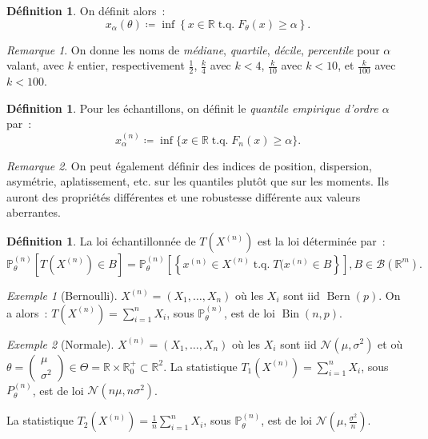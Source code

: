 \documentclass{report}
\DeclareMathOperator{\tq}{\text{ t.q. }}
\DeclareMathOperator{\Bern}{Bern}  %
\DeclareMathOperator{\Bin}{Bin}
\renewcommand{\P}{\mathbb P}
\newcommand{\Nms}{\mathcal N(\mu, \sigma^2)}
\newcommand{\R}{\mathbb R}
\newcommand{\Brl}{\mathcal B}  %
\theoremstyle{definition}
\newtheorem{déf}[thm]{Définition}
\theoremstyle{remark}
\newtheorem*{rmq}{Remarque}
\newtheorem{ex}{Exemple}[chapter]
\begin{document}
		\begin{déf} On définit alors~:
		\[x_\alpha(\theta) \coloneqq \inf\left\{x \in \R \tq F_\theta(x) \geq \alpha\right\}.\]
		\end{déf}

		\begin{rmq} On donne les noms de \textit{médiane}, \textit{quartile}, \textit{décile}, \textit{percentile} pour $\alpha$ valant, avec $k$ entier,
		respectivement $\frac 12$, $\frac k4$ avec $k < 4$, $\frac k{10}$ avec $k < 10$, et $\frac k{100}$ avec $k < 100$.
		\end{rmq}

		\begin{déf} Pour les échantillons, on définit le \textit{quantile empirique d'ordre $\alpha$} par~:
		\[x_\alpha^{(n)} \coloneqq \inf\{x \in \R \tq F_n(x) \geq \alpha\}.\]
		\end{déf}

		\begin{rmq} On peut également définir des indices de position, dispersion, asymétrie, aplatissement, etc. sur les quantiles plutôt que sur les moments.
		Ils auront des propriétés différentes et une robustesse différente aux valeurs aberrantes.
		\end{rmq}

		\begin{déf} La loi échantillonnée de $T(X^{(n)})$ est la loi déterminée par~:
		\[\P_\theta^{(n)}\left[T(X^{(n)}) \in B\right] = \P_\theta^{(n)}\left[\left\{x^{(n)} \in X^{(n)} \tq T(x^{(n)} \in B\right\}\right], B \in \Brl(\R^m).\]
		\end{déf}

		\begin{ex}[Bernoulli] $X^{(n)} = (X_1, \ldots, X_n)$ où les $X_i$ sont iid $\Bern(p)$. On a alors~: $T(X^{(n)}) = \sum_{i=1}^nX_i$, sous
		$\P_\theta^{(n)}$, est de loi $\Bin(n, p)$.
		\end{ex}

		\begin{ex}[Normale] $X^{(n)} = (X_1, \ldots, X_n)$ où les $X_i$ sont iid $\Nms$ et où
		$\theta = \begin{pmatrix}\mu \\ \sigma^2\end{pmatrix} \in \Theta = \R \times \R^+_0 \subset \R^2$.
		La statistique $T_1(X^{(n)}) = \sum_{i=1}^nX_i$, sous $P_\theta^{(n)}$, est de loi $\mathcal N(n\mu, n\sigma^2)$.

		La statistique $T_2(X^{(n)}) = \frac 1n\sum_{i=1}^nX_i$, sous $\P_\theta^{(n)}$, est de loi $\mathcal N(\mu, \frac {\sigma^2}n)$.
		\end{ex}
\end{document}
